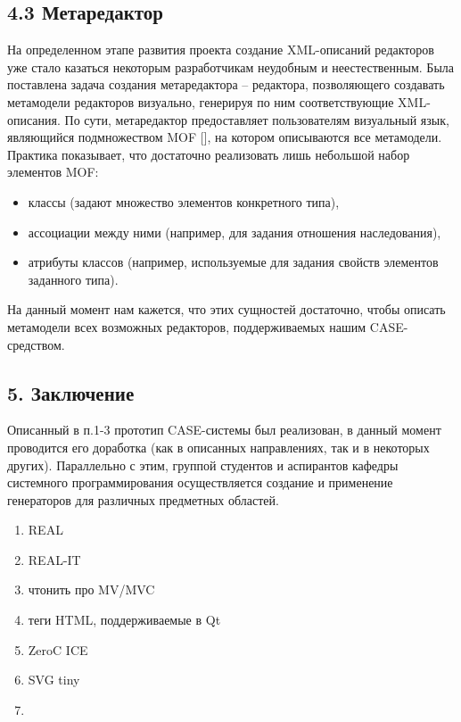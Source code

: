 \documentclass[a4paper]{article}
\newcommand\liststyleWWviiiNumxix{%
\renewcommand\theenumi{\arabic{enumi}}
\renewcommand\theenumii{\arabic{enumii}}
\renewcommand\theenumiii{\arabic{enumiii}}
\renewcommand\labelitemi{[F0B7?]}
\renewcommand\labelenumi{\theenumi.}
\renewcommand\labelenumii{\theenumii.}
\renewcommand\labelenumiii{\theenumiii.}
}
\newcommand\liststyleWWviiiNumxx{%
\renewcommand\theenumi{\arabic{enumi}}
\renewcommand\theenumii{\arabic{enumii}}
\renewcommand\theenumiii{\arabic{enumiii}}
\renewcommand\theenumiv{\arabic{enumiv}}
\renewcommand\labelenumi{\theenumi.}
\renewcommand\labelenumii{\theenumii.}
\renewcommand\labelenumiii{\theenumiii.}
\renewcommand\labelenumiv{\theenumiv.}
}
\begin{document}
\bigskip

\subsection[4.3 Метаредактор]{4.3 Метаредактор}
{
На определенном этапе развития проекта создание XML-описаний редакторов
уже стало казаться некоторым разработчикам неудобным и неестественным.
Была поставлена задача создания метаредактора – редактора, позволяющего
создавать метамодели редакторов визуально, генерируя по ним
соответствующие XML-описания. По сути, метаредактор предоставляет
пользователям визуальный язык, являющийся подмножеством
\foreignlanguage{english}{MOF} [], на котором описываются все
метамодели. Практика показывает, что достаточно реализовать лишь
небольшой набор элементов \foreignlanguage{english}{MOF}: }

\liststyleWWviiiNumxix
\begin{itemize}
\item {
классы (задают множество элементов конкретного типа), }
\item {
ассоциации между ними (например, для задания отношения наследования), }
\item {
атрибуты классов (например, используемые для задания свойств элементов
заданного типа). }
\end{itemize}
{
На данный момент нам кажется, что этих сущностей достаточно, чтобы
описать метамодели всех возможных редакторов, поддерживаемых нашим
CASE-средством.}


\bigskip

\subsection[5. Заключение]{5. Заключение}
{
Описанный в п.1-3 прототип \foreignlanguage{english}{CASE}{}-системы был
реализован, в данный момент проводится его доработка (как в описанных
направлениях, так и в некоторых других). Параллельно с этим, группой
студентов и аспирантов кафедры системного программирования
осуществляется создание и применение генераторов для различных
предметных областей. }


\bigskip


\liststyleWWviiiNumxx
\begin{enumerate}
\item {
REAL}
\item {
REAL-IT}
\item {
чтонить про MV/MVC}
\item {
теги HTML, поддерживаемые в Qt}
\item {
ZeroC ICE}
\item {
SVG tiny}
\item 
\bigskip
\end{enumerate}
\end{document}
